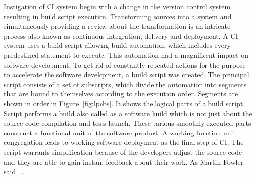Instigation of CI system begin with a change in the version control system resulting in build script execution. Transforming sources into a system and simultaneously providing a review about the transformation is an intricate process also known as continuous integration, delivery and deployment. A CI system uses a build script allowing build automation, which includes every predestined statement to execute. This automation had a magnificent impact on software development. To get rid of constantly repeated actions for the purpose to accelerate the software development, a build script was created. The principal script consists of a set of subscripts, which divide the automation into segments that are bound to themselves according to the execution order. Segments are shown in order in Figure~\ref{fig:lpobs}. It shows the logical parts of a build script. Script performs a build also called as a software build which is not just about the source code compilation and tests launch. These various smoothly executed parts construct a functional unit of the software product. A working function unit congregation leads to working software deployment as the final step of CI. The script warrants simplification because of the developers adjust the source code and they are able to gain instant feedback about their work. As Martin Fowler said ~\cite{MartinFowler}.

